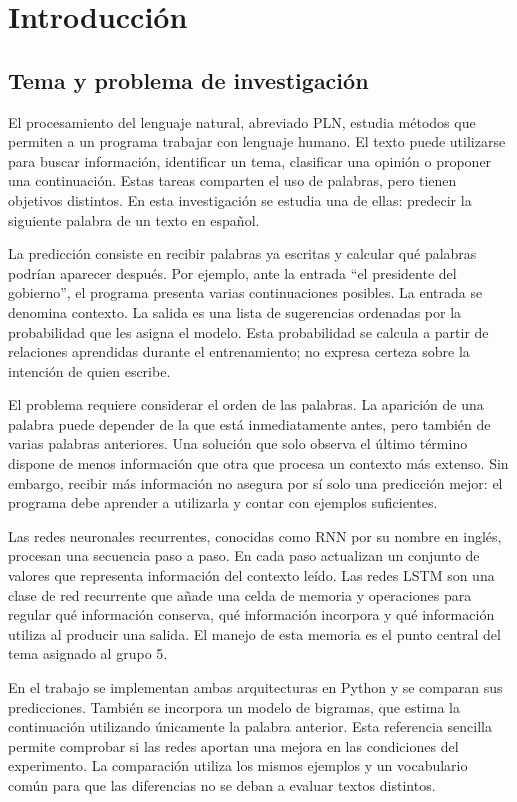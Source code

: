 \section{Introducción}
\subsection{Tema y problema de investigación}
El procesamiento del lenguaje natural, abreviado PLN, estudia métodos que permiten a un programa trabajar con lenguaje humano. El texto puede utilizarse para buscar información, identificar un tema, clasificar una opinión o proponer una continuación. Estas tareas comparten el uso de palabras, pero tienen objetivos distintos. En esta investigación se estudia una de ellas: predecir la siguiente palabra de un texto en español.

La predicción consiste en recibir palabras ya escritas y calcular qué palabras podrían aparecer después. Por ejemplo, ante la entrada ``el presidente del gobierno'', el programa presenta varias continuaciones posibles. La entrada se denomina contexto. La salida es una lista de sugerencias ordenadas por la probabilidad que les asigna el modelo. Esta probabilidad se calcula a partir de relaciones aprendidas durante el entrenamiento; no expresa certeza sobre la intención de quien escribe.

El problema requiere considerar el orden de las palabras. La aparición de una palabra puede depender de la que está inmediatamente antes, pero también de varias palabras anteriores. Una solución que solo observa el último término dispone de menos información que otra que procesa un contexto más extenso. Sin embargo, recibir más información no asegura por sí solo una predicción mejor: el programa debe aprender a utilizarla y contar con ejemplos suficientes.

Las redes neuronales recurrentes, conocidas como RNN por su nombre en inglés, procesan una secuencia paso a paso. En cada paso actualizan un conjunto de valores que representa información del contexto leído. Las redes LSTM son una clase de red recurrente que añade una celda de memoria y operaciones para regular qué información conserva, qué información incorpora y qué información utiliza al producir una salida. El manejo de esta memoria es el punto central del tema asignado al grupo 5.

En el trabajo se implementan ambas arquitecturas en Python y se comparan sus predicciones. También se incorpora un modelo de bigramas, que estima la continuación utilizando únicamente la palabra anterior. Esta referencia sencilla permite comprobar si las redes aportan una mejora en las condiciones del experimento. La comparación utiliza los mismos ejemplos y un vocabulario común para que las diferencias no se deban a evaluar textos distintos.

